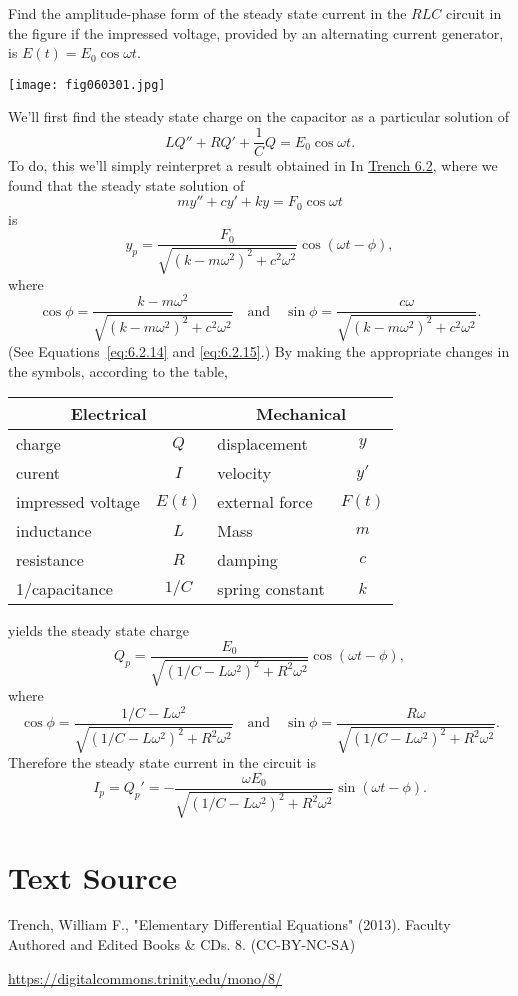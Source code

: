 \documentclass{ximera}
\begin{document}
\begin{example}\label{example:6.3.2}
Find the amplitude-phase form of the steady state current in the $RLC$
circuit in the figure if the impressed voltage, provided by
an alternating current generator, is $E(t)=E_0\cos\omega t$.

\begin{image}
  \texttt{[image: fig060301.jpg]} 
\end{image}

\begin{explanation}
We'll first find the steady state charge on the capacitor as
a particular solution of
$$
LQ''+RQ'+\frac{1}{C}Q=E_0\cos\omega t.
$$
To do, this we'll simply reinterpret a result obtained in
In \href{https://ximera.osu.edu/ode/main/springProblemsII/springProblemsII}{Trench 6.2}, where we found that the steady state solution of
$$
my''+cy'+ky=F_0\cos\omega t
$$
is
$$
y_p=\frac{F_0}{\sqrt{(k-m\omega^2)^2+c^2\omega^2}}
\cos(\omega t-\phi),
$$
where
$$
\cos\phi=\frac{k-m\omega^2}{\sqrt
{(k-m\omega^2)^2+c^2\omega^2}}\quad\mbox{and}\quad
\sin\phi=\frac{c\omega}{\sqrt{(k-m\omega^2)^2+c^2\omega^2}}.
$$
(See Equations~\eqref{eq:6.2.14} and \eqref{eq:6.2.15}.) By making the
appropriate changes in the symbols, according to the table,

\begin{center}
\begin{tabular}{|lc|lc|}\hline
\multicolumn{2}{|c|}{\bf Electrical}&
\multicolumn{2}{c|}{\bf Mechanical}\\\hline
charge& $Q$& displacement&$y$\\\hline
curent&$I$&velocity&$y'$\\\hline
impressed voltage&$E(t)$&external force&$F(t)$\\\hline
inductance&$L$&Mass&$m$\\\hline
resistance&$R$&damping&$c$\\\hline
1/capacitance&$1/C$&spring constant&$k$\\\hline
\end{tabular}
\end{center}

yields the steady state charge
$$
Q_p=\frac{E_0}{\sqrt{(1/C-L\omega^2)^2+R^2\omega^2}}\cos(\omega
t-\phi),
$$
where
$$
\cos\phi=\frac{1/C-L\omega^2}{\sqrt{(1/C-L\omega^2)^2+R^2\omega^2}}
\quad\mbox{and}\quad
\sin\phi=\frac{R\omega}{\sqrt{(1/C-L\omega^2)^2+R^2\omega^2}}.
$$
 Therefore the steady state current in the circuit
is
$$
I_p=Q_p'=
-\frac{\omega E_0}{\sqrt{(1/C-L\omega^2)^2+R^2\omega^2}}\sin(\omega
t-\phi).
$$
\end{explanation}
\end{example}
\section*{Text Source}
Trench, William F., "Elementary Differential Equations" (2013). Faculty Authored and Edited Books \& CDs. 8. (CC-BY-NC-SA)

\href{https://digitalcommons.trinity.edu/mono/8/}{https://digitalcommons.trinity.edu/mono/8/}
\end{document}

